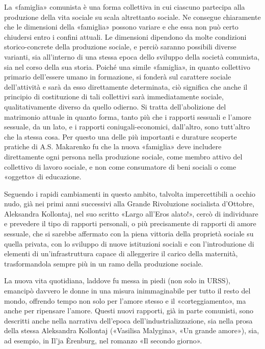 \documentclass[../main]{subfiles}
\begin{document}
La «famiglia» comunista è una forma collettiva in cui ciascuno partecipa alla produzione della vita sociale su scala altrettanto sociale. Ne consegue chiaramente che le dimensioni della «famiglia» possono variare e che essa non può certo chiudersi entro i confini attuali. Le dimensioni dipendono da molte condizioni storico-concrete della produzione sociale, e perciò saranno possibili diverse varianti, sia all'interno di una stessa epoca dello sviluppo della società comunista, sia nel corso della sua storia. Poiché una simile «famiglia», in quanto collettivo primario dell'essere umano in formazione, si fonderà sul carattere sociale dell'attività e sarà da esso direttamente determinata, ciò significa che anche il principio di costituzione di tali collettivi sarà immediatamente sociale, qualitativamente diverso da quello odierno. Si tratta dell'abolizione del matrimonio attuale in quanto forma, tanto più che i rapporti sessuali e l'amore sessuale, da un lato, e i rapporti coniugali-economici, dall'altro, sono tutt'altro che la stessa cosa. Per questo una delle più importanti e durature scoperte pratiche di A.S. Makarenko fu che la nuova «famiglia» deve includere direttamente ogni persona nella produzione sociale, come membro attivo del collettivo di lavoro sociale, e non come consumatore di beni sociali o come «oggetto» di educazione.

Seguendo i rapidi cambiamenti in questo ambito, talvolta impercettibili a occhio nudo, già nei primi anni successivi alla Grande Rivoluzione socialista d'Ottobre, Aleksandra Kollontaj, nel suo scritto «Largo all'Eros alato!», cercò di individuare e prevedere il tipo di rapporti personali, o più precisamente di rapporti di amore sessuale, che si sarebbe affermato con la piena vittoria della proprietà sociale su quella privata, con lo sviluppo di nuove istituzioni sociali e con l'introduzione di elementi di un'infrastruttura capace di alleggerire il carico della maternità, trasformandola sempre più in un ramo della produzione sociale.

La nuova vita quotidiana, laddove fu messa in piedi (non solo in URSS), emancipò davvero le donne in una misura inimmaginabile per tutto il resto del mondo, offrendo tempo non solo per l'amore stesso e il «corteggiamento», ma anche per ripensare l'amore. Questi nuovi rapporti, già in parte comunisti, sono descritti anche nella narrativa dell'epoca dell'industrializzazione, sia nella prosa della stessa Aleksandra Kollontaj («Vasilisa Malygina», «Un grande amore»), sia, ad esempio, in Il'ja Ėrenburg, nel romanzo «Il secondo giorno».
\end{document}
